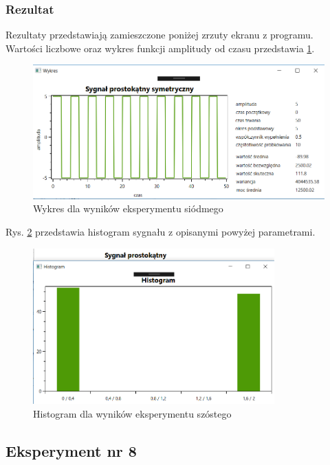 \documentclass[12pt]{article}
\begin{document}
\subsubsection{Rezultat}
Rezultaty przedstawiają zamieszczone poniżej zrzuty ekranu z programu. Wartości liczbowe oraz wykres funkcji amplitudy od czasu przedstawia \ref{Wykres dla wyników eksperymentu siódmego}.
\begin{figure}[h!]
 \centering
 \includegraphics[width=12.3cm]{SygProstSym.PNG}
 \vspace{-0.3cm}
 \caption{Wykres dla wyników eksperymentu siódmego}
 \label{Wykres dla wyników eksperymentu siódmego}
\end{figure}

\newpage
Rys. \ref{Histogram dla wyników eksperymentu szóstego} przedstawia histogram sygnału z opisanymi powyżej parametrami. 
\begin{figure}[h!]
 \centering
 \includegraphics[width=9.3cm]{SygProstHist.PNG}
 \vspace{-0.3cm}
 \caption{Histogram dla wyników eksperymentu szóstego}
 \label{Histogram dla wyników eksperymentu szóstego}
\end{figure}

\subsection{Eksperyment nr 8}
\end{document}
